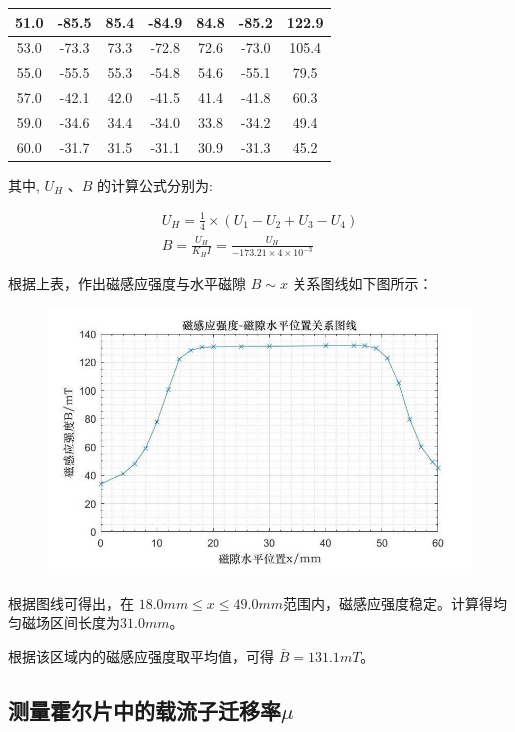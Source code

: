 \documentclass[UTF8]{ctexart}
\begin{document}
\begin{center}
\begin{tabular}{c|c|c|c|c|c|c}
    51.0  & -85.5 & 85.4  & -84.9 & 84.8  & -85.2 & 122.9 \\
    \hline
    53.0  & -73.3 & 73.3  & -72.8 & 72.6  & -73.0 & 105.4 \\
    \hline
    55.0  & -55.5 & 55.3  & -54.8 & 54.6  & -55.1 & 79.5 \\
    \hline
    57.0  & -42.1 & 42.0  & -41.5 & 41.4  & -41.8 & 60.3 \\
    \hline
    59.0  & -34.6 & 34.4  & -34.0 & 33.8  & -34.2 & 49.4 \\
    \hline
    60.0  & -31.7 & 31.5  & -31.1 & 30.9  & -31.3 & 45.2 \\
    \hline
  \end{tabular}%
\end{center}

其中, $ U_{H}$ 、$ B $ 的计算公式分别为:

$$
\begin{array}{c}
U_{H}=\frac{1}{4} \times\left(U_{1}-U_{2}+U_{3}-U_{4}\right) \\
B=\frac{U_{H}}{K_{H} I}=\frac{U_{H}}{-173.21 \times 4 \times 10^{-3}}
\end{array}
$$

根据上表，作出磁感应强度与水平磁隙 $B \sim x$ 关系图线如下图所示：

\begin{figure}[H]
  \centering
  \includegraphics[scale=0.5]{拟合3.jpg}
\end{figure}

根据图线可得出，在 $18.0mm \leq x \leq 49.0mm $范围内，磁感应强度稳定。计算得均匀磁场区间长度为$31.0mm$。

根据该区域内的磁感应强度取平均值，可得 $\bar{B} = 131.1mT$。

\subsection{测量霍尔片中的载流子迁移率$\mu$}
\end{document}

